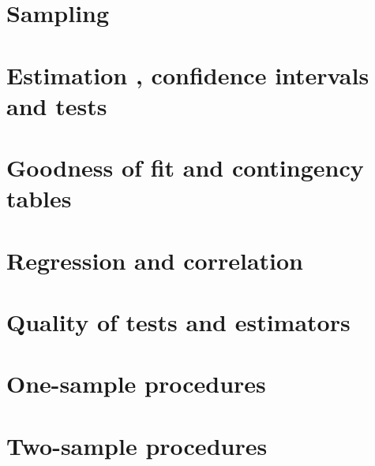 \documentclass[a4paper]{article}
\begin{document}
\section{Sampling}

\section{Estimation , confidence intervals and tests}

\section{Goodness of fit and contingency tables}

\section{Regression and correlation}

\section{Quality of tests and estimators}

\section{One-sample procedures}

\section{Two-sample procedures}

\printindex
\end{document}
